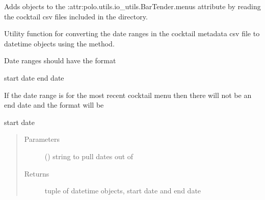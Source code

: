 \documentclass[letterpaper,10pt,english]{sphinxmanual}
\begin{document}
\begin{fulllineitems}
\begin{fulllineitems}
\label{\detokenize{polo.utils:polo.utils.io_utils.BarTender.add_menus_from_metadata}}
Adds {\hyperref[\detokenize{polo.utils:polo.utils.io_utils.Menu}]{}} objects to the :attr:polo.utils.io\_utils.BarTender.menus\textasciigrave{}
attribute by reading the cocktail csv files included
in the  directory.

\end{fulllineitems}


\begin{fulllineitems}
\label{\detokenize{polo.utils:polo.utils.io_utils.BarTender.date_range_parser}}
Utility function for converting the date ranges in the cocktail
metadata csv file to datetime objects using the 
{\hyperref[\detokenize{polo.utils:polo.utils.io_utils.BarTender.datetime_converter}]{}}
method.

Date ranges should have the format

\begin{sphinxVerbatim}[commandchars=\\\{\}]
\PYGZsq{}start date \PYGZhy{} end date\PYGZsq{}

If the date range is for the most recent cocktail menu then there
will not be an end date and the format will be

\PYGZsq{}start date \PYGZhy{} \PYGZsq{}
\end{sphinxVerbatim}
\begin{quote}\begin{description}
\item[{Parameters}] \leavevmode
{} () \textendash{} string to pull dates out of

\item[{Returns}] \leavevmode
tuple of datetime objects, start date and end date


\end{description}
\end{quote}
\end{fulllineitems}
\end{fulllineitems}
\end{document}
